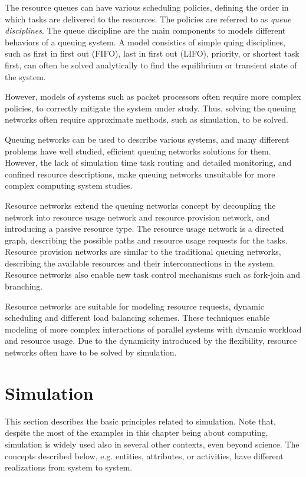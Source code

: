 The resource queues can have various scheduling policies, defining the order in which tasks are delivered to the resources. The policies are referred to as \emph{queue disciplines}. The queue discipline are the main components to models different behaviors of a queuing system. A model consistics of simple quing disciplines, such as first in first out (FIFO), last in first out (LIFO), priority, or shortest task first, can often be solved analytically to find the equilibrium or transient state of the system.~\cite{Bolch:2006:Queuing}

However, models of systems such as packet processors often require more complex policies, to correctly mitigate the system under study. Thus, solving the queuing networks often require approximate methods, such as simulation, to be solved.~\cite{Bolch:2006:Queuing}

Queuing networks can be used to describe various systems, and many different problems have well studied, efficient queuing networks solutions for them. However, the lack of simulation time task routing and detailed monitoring, and confined resource descriptions, make queuing networks unsuitable for more complex computing system studies.~\cite{Bolch:2006:Queuing}

Resource networks extend the queuing networks concept by decoupling the network into resource usage network and resource provision network, and introducing a passive resource type. The resource usage network is a directed graph, describing the possible paths and resource usage requests for the tasks. Resource provision networks are similar to the traditional queuing networks, describing the available resources and their interconnections in the system. Resource networks also enable new task control mechanisms such as fork-join and branching. ~\cite{Menasce:1994:CPP}

Resource networks are suitable for modeling resource requests, dynamic scheduling and different load balancing schemes. These techniques enable modeling of more complex interactions of parallel systems with dynamic workload and resource usage. Due to the dynamicity introduced by the flexibility, resource networks often have to be solved by simulation.~\cite{Menasce:1994:CPP}

\section{Simulation}
This section describes the basic principles related to simulation. Note that, despite the most of the examples in this chapter being about computing, simulation is widely used also in several other contexts, even beyond science. The concepts described below, e.g. entities, attributes, or activities, have different realizations from system to system.

